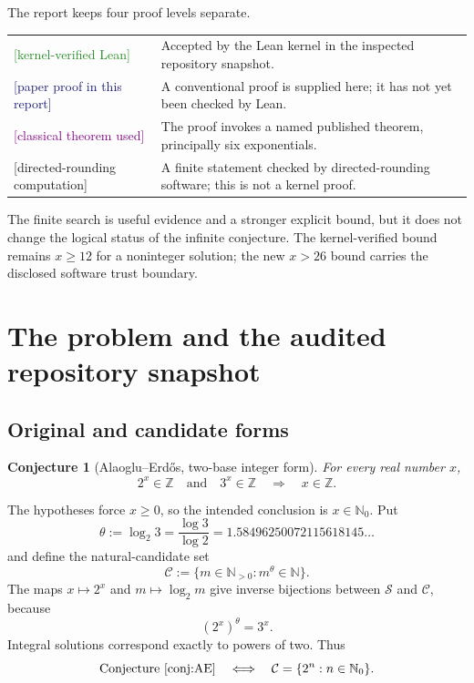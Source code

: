 \documentclass[11pt,oneside]{article}
\newtheorem{conjecture}[theorem]{Conjecture}
\theoremstyle{definition}
\newcommand{\N}{\mathbb N}
\newcommand{\Nzero}{\mathbb N_0}
\newcommand{\Z}{\mathbb Z}
\newcommand{\Sol}{\mathcal S}
\newcommand{\Cand}{\mathcal C}
\newcommand{\tagLean}{\textcolor{ForestGreen}{\textsf{[kernel-verified Lean]}}}
\newcommand{\tagPaper}{\textcolor{MidnightBlue}{\textsf{[paper proof in this report]}}}
\newcommand{\tagClassical}{\textcolor{Purple}{\textsf{[classical theorem used]}}}
\newcommand{\tagComp}{\textcolor{BurntOrange}{\textsf{[directed-rounding computation]}}}
\begin{document}
The report keeps four proof levels separate.
\begin{center}
\begin{tabularx}{0.95\textwidth}{@{}Z Y@{}}
\toprule
\tagLean & Accepted by the Lean kernel in the inspected repository snapshot.\\
\tagPaper & A conventional proof is supplied here; it has not yet been checked by Lean.\\
\tagClassical & The proof invokes a named published theorem, principally six exponentials.\\
\tagComp & A finite statement checked by directed-rounding software; this is not a kernel proof.\\
\bottomrule
\end{tabularx}
\end{center}

The finite search is useful evidence and a stronger explicit bound, but it does not change
the logical status of the infinite conjecture.  The kernel-verified bound remains
\(x\ge12\) for a noninteger solution; the new \(x>26\) bound carries the disclosed
software trust boundary.

\section{The problem and the audited repository snapshot}\label{sec:problem}

\subsection{Original and candidate forms}

\begin{conjecture}[Alaoglu--Erd\H{o}s, two-base integer form]\label{conj:AE}
For every real number \(x\),
\[
  2^x\in\Z\quad\text{and}\quad 3^x\in\Z
  \quad\Longrightarrow\quad x\in\Z.
\]
\end{conjecture}

The hypotheses force \(x\ge0\), so the intended conclusion is \(x\in\Nzero\).  Put
\[
  \theta:=\log_2 3=\frac{\log3}{\log2}
   =1.58496250072115618145\ldots
\]
and define the natural-candidate set
\[
  \Cand:=\{m\in\N_{>0}:m^\theta\in\N\}.
\]
The maps \(x\mapsto2^x\) and \(m\mapsto\log_2m\) give inverse bijections between
\(\Sol\) and \(\Cand\), because
\[
  (2^x)^\theta=3^x.
\]
Integral solutions correspond exactly to powers of two.  Thus
\[
  \text{Conjecture~\ref{conj:AE}}
  \quad\Longleftrightarrow\quad
  \Cand=\{2^n:n\in\Nzero\}.
\]
\end{document}
